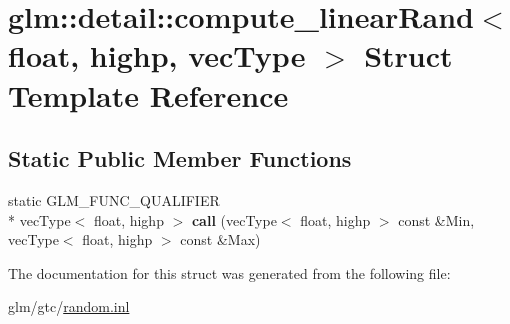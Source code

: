 \hypertarget{structglm_1_1detail_1_1compute__linearRand_3_01float_00_01highp_00_01vecType_01_4}{\section{glm\-:\-:detail\-:\-:compute\-\_\-linear\-Rand$<$ float, highp, vec\-Type $>$ Struct Template Reference}
\label{structglm_1_1detail_1_1compute__linearRand_3_01float_00_01highp_00_01vecType_01_4}
}
\subsection*{Static Public Member Functions}
\begin{DoxyCompactItemize}
\item 
\hypertarget{structglm_1_1detail_1_1compute__linearRand_3_01float_00_01highp_00_01vecType_01_4_a1ac79c6d4365ce29a99e45327d51ec47}{static G\-L\-M\-\_\-\-F\-U\-N\-C\-\_\-\-Q\-U\-A\-L\-I\-F\-I\-E\-R \\*
vec\-Type$<$ float, highp $>$ {\bfseries call} (vec\-Type$<$ float, highp $>$ const \&Min, vec\-Type$<$ float, highp $>$ const \&Max)}\label{structglm_1_1detail_1_1compute__linearRand_3_01float_00_01highp_00_01vecType_01_4_a1ac79c6d4365ce29a99e45327d51ec47}

\end{DoxyCompactItemize}


The documentation for this struct was generated from the following file\-:\begin{DoxyCompactItemize}
\item 
glm/gtc/\hyperlink{random_8inl}{random.\-inl}\end{DoxyCompactItemize}
